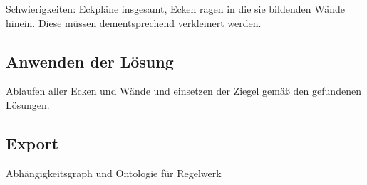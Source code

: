 Schwierigkeiten: Eckpläne insgesamt, Ecken ragen in die sie bildenden Wände hinein. Diese müssen dementsprechend verkleinert werden.

\subsection{Anwenden der Lösung}
Ablaufen aller Ecken und Wände und einsetzen der Ziegel gemäß den gefundenen Lösungen.

\subsection{Export}
Abhängigkeitsgraph und Ontologie für Regelwerk